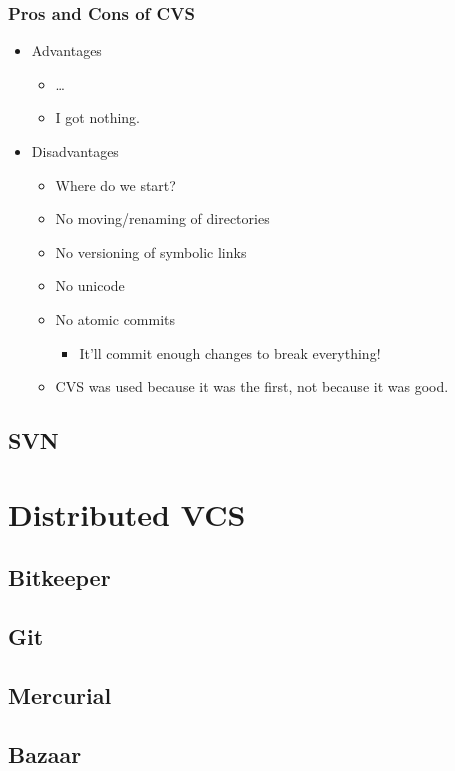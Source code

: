 \documentclass{beamer}
\begin{document}
\begin{frame}
    \frametitle{Pros and Cons of CVS}
    \begin{itemize}
	\item Advantages
	\begin{itemize}
	    \item \ldots
	    \item I got nothing.
	\end{itemize}
    \item Disadvantages
	\begin{itemize}
	    \item Where do we start?
	    \item No moving/renaming of directories
	    \item No versioning of symbolic links
	    \item No unicode
	    \item No atomic commits 
	    \begin{itemize}
		\item It'll commit enough changes to break everything!
	    \end{itemize}
	    \item CVS was used because it was the first, not because it was good.
	\end{itemize}
    \end{itemize}
\end{frame}

\subsection{SVN}
\section{Distributed VCS}
\subsection{Bitkeeper}
\subsection{Git}
\subsection{Mercurial}
\subsection{Bazaar}
\end{document}
